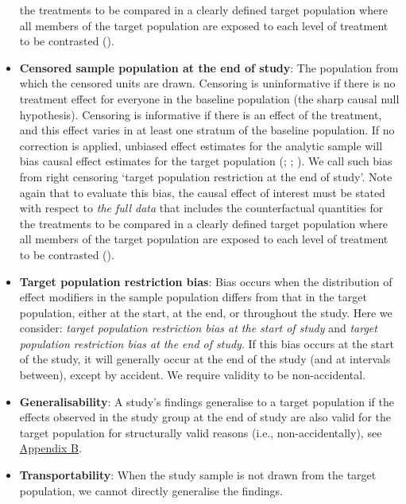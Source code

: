 \documentclass[
  single column]{article}
\begin{document}
\begin{itemize}
  the treatments to be compared in a clearly defined target population
  where all members of the target population are exposed to each level
  of treatment to be contrasted ().
\item
  \textbf{Censored sample population at the end of study}: The
  population from which the censored units are drawn. Censoring is
  uninformative if there is no treatment effect for everyone in the
  baseline population (the sharp causal null hypothesis). Censoring is
  informative if there is an effect of the treatment, and this effect
  varies in at least one stratum of the baseline population. If no
  correction is applied, unbiased effect estimates for the analytic
  sample will bias causal effect estimates for the target population
  (;
  ;
  ). We call such bias
  from right censoring `target population restriction at the end of
  study'. Note again that to evaluate this bias, the causal effect of
  interest must be stated with respect to \emph{the full data} that
  includes the counterfactual quantities for the treatments to be
  compared in a clearly defined target population where all members of
  the target population are exposed to each level of treatment to be
  contrasted ().
\item
  \textbf{Target population restriction bias}: Bias occurs when the
  distribution of effect modifiers in the sample population differs from
  that in the target population, either at the start, at the end, or
  throughout the study. Here we consider: \emph{target population
  restriction bias at the start of study} and \emph{target population
  restriction bias at the end of study}. If this bias occurs at the
  start of the study, it will generally occur at the end of the study
  (and at intervals between), except by accident. We require validity to
  be non-accidental.
\item
  \textbf{Generalisability}: A study's findings generalise to a target
  population if the effects observed in the study group at the end of
  study are also valid for the target population for structurally valid
  reasons (i.e., non-accidentally), see \hyperref[id-app-b]{Appendix B}.
\item
  \textbf{Transportability}: When the study sample is not drawn from the
  target population, we cannot directly generalise the findings.

\end{itemize}
\end{document}
